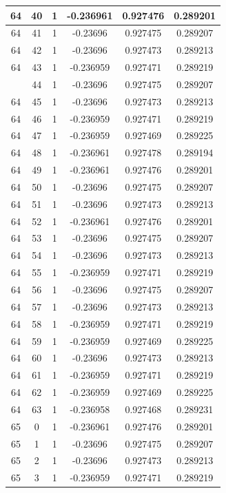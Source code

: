 \documentclass[12pt,a4paper]{article}
\numberwithin{equation}{section}
\numberwithin{figure}{section}
\numberwithin{table}{section}
\begin{document}
\begin{longtable}{|c|c|c|c|c|c|}
64 & 40 & 1 & -0.236961 & 0.927476 & 0.289201 \\ \hline
64 & 41 & 1 & -0.23696 & 0.927475 & 0.289207 \\ \hline
64 & 42 & 1 & -0.23696 & 0.927473 & 0.289213 \\ \hline
64 & 43 & 1 & -0.236959 & 0.927471 & 0.289219 \\ \hline
\pagebreak
64 & 44 & 1 & -0.23696 & 0.927475 & 0.289207 \\ \hline
64 & 45 & 1 & -0.23696 & 0.927473 & 0.289213 \\ \hline
64 & 46 & 1 & -0.236959 & 0.927471 & 0.289219 \\ \hline
64 & 47 & 1 & -0.236959 & 0.927469 & 0.289225 \\ \hline
64 & 48 & 1 & -0.236961 & 0.927478 & 0.289194 \\ \hline
64 & 49 & 1 & -0.236961 & 0.927476 & 0.289201 \\ \hline
64 & 50 & 1 & -0.23696 & 0.927475 & 0.289207 \\ \hline
64 & 51 & 1 & -0.23696 & 0.927473 & 0.289213 \\ \hline
64 & 52 & 1 & -0.236961 & 0.927476 & 0.289201 \\ \hline
64 & 53 & 1 & -0.23696 & 0.927475 & 0.289207 \\ \hline
64 & 54 & 1 & -0.23696 & 0.927473 & 0.289213 \\ \hline
64 & 55 & 1 & -0.236959 & 0.927471 & 0.289219 \\ \hline
64 & 56 & 1 & -0.23696 & 0.927475 & 0.289207 \\ \hline
64 & 57 & 1 & -0.23696 & 0.927473 & 0.289213 \\ \hline
64 & 58 & 1 & -0.236959 & 0.927471 & 0.289219 \\ \hline
64 & 59 & 1 & -0.236959 & 0.927469 & 0.289225 \\ \hline
64 & 60 & 1 & -0.23696 & 0.927473 & 0.289213 \\ \hline
64 & 61 & 1 & -0.236959 & 0.927471 & 0.289219 \\ \hline
64 & 62 & 1 & -0.236959 & 0.927469 & 0.289225 \\ \hline
64 & 63 & 1 & -0.236958 & 0.927468 & 0.289231 \\ \hline
65 & 0 & 1 & -0.236961 & 0.927476 & 0.289201 \\ \hline
65 & 1 & 1 & -0.23696 & 0.927475 & 0.289207 \\ \hline
65 & 2 & 1 & -0.23696 & 0.927473 & 0.289213 \\ \hline
65 & 3 & 1 & -0.236959 & 0.927471 & 0.289219 \\ \hline

\end{longtable}
\end{document}
